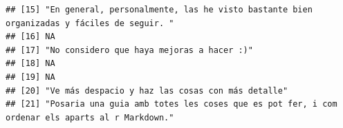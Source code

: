 \documentclass[
]{article}
\begin{document}
\begin{verbatim}
## [15] "En general, personalmente, las he visto bastante bien organizadas y fáciles de seguir. "                                                                                                                                                                                                                                                                                                            
## [16] NA                                                                                                                                                                                                                                                                                                                                                                                                   
## [17] "No considero que haya mejoras a hacer :)"                                                                                                                                                                                                                                                                                                                                                           
## [18] NA                                                                                                                                                                                                                                                                                                                                                                                                   
## [19] NA                                                                                                                                                                                                                                                                                                                                                                                                   
## [20] "Ve más despacio y haz las cosas con más detalle"                                                                                                                                                                                                                                                                                                                                                    
## [21] "Posaria una guia amb totes les coses que es pot fer, i com ordenar els aparts al r Markdown."                                                                                                                                                                                                                                                                                                       

\end{verbatim}
\end{document}
